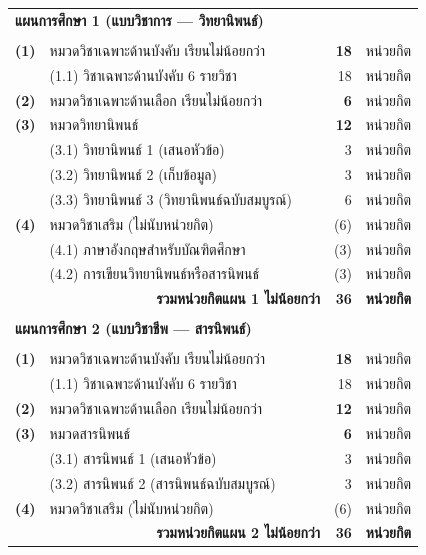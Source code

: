 \vspace{4pt}
\begingroup
\footnotesize
\setlength{\tabcolsep}{4pt}
\renewcommand{\arraystretch}{1.2}
\begin{tabularx}{\linewidth}{l>{\raggedright\arraybackslash}X r l r l}
  \multicolumn{6}{l}{\textbf{แผนการศึกษา 1 (แบบวิชาการ --- วิทยานิพนธ์)}} \\
  \multicolumn{6}{l}{} \\
  \textbf{(1)} & หมวดวิชาเฉพาะด้านบังคับ เรียนไม่น้อยกว่า & & & \textbf{18} & หน่วยกิต \\
  & \quad (1.1) วิชาเฉพาะด้านบังคับ 6 รายวิชา & & & 18 & หน่วยกิต \\
  \textbf{(2)} & หมวดวิชาเฉพาะด้านเลือก เรียนไม่น้อยกว่า & & & \textbf{6} & หน่วยกิต \\
  \textbf{(3)} & หมวดวิทยานิพนธ์ & & & \textbf{12} & หน่วยกิต \\
  & \quad (3.1) วิทยานิพนธ์ 1 (เสนอหัวข้อ) & & & 3 & หน่วยกิต \\
  & \quad (3.2) วิทยานิพนธ์ 2 (เก็บข้อมูล) & & & 3 & หน่วยกิต \\
  & \quad (3.3) วิทยานิพนธ์ 3 (วิทยานิพนธ์ฉบับสมบูรณ์) & & & 6 & หน่วยกิต \\
  \textbf{(4)} & หมวดวิชาเสริม (ไม่นับหน่วยกิต) & & & (6) & หน่วยกิต \\
  & \quad (4.1) ภาษาอังกฤษสำหรับบัณฑิตศึกษา & & & (3) & หน่วยกิต \\
  & \quad (4.2) การเขียนวิทยานิพนธ์หรือสารนิพนธ์ & & & (3) & หน่วยกิต \\
  \multicolumn{4}{r}{\textbf{รวมหน่วยกิตแผน 1 ไม่น้อยกว่า}} & \textbf{36} & \textbf{หน่วยกิต} \\
  \multicolumn{6}{l}{} \\
  \multicolumn{6}{l}{\textbf{แผนการศึกษา 2 (แบบวิชาชีพ --- สารนิพนธ์)}} \\
  \multicolumn{6}{l}{} \\
  \textbf{(1)} & หมวดวิชาเฉพาะด้านบังคับ เรียนไม่น้อยกว่า & & & \textbf{18} & หน่วยกิต \\
  & \quad (1.1) วิชาเฉพาะด้านบังคับ 6 รายวิชา & & & 18 & หน่วยกิต \\
  \textbf{(2)} & หมวดวิชาเฉพาะด้านเลือก เรียนไม่น้อยกว่า & & & \textbf{12} & หน่วยกิต \\
  \textbf{(3)} & หมวดสารนิพนธ์ & & & \textbf{6} & หน่วยกิต \\
  & \quad (3.1) สารนิพนธ์ 1 (เสนอหัวข้อ) & & & 3 & หน่วยกิต \\
  & \quad (3.2) สารนิพนธ์ 2 (สารนิพนธ์ฉบับสมบูรณ์) & & & 3 & หน่วยกิต \\
  \textbf{(4)} & หมวดวิชาเสริม (ไม่นับหน่วยกิต) & & & (6) & หน่วยกิต \\
  \multicolumn{4}{r}{\textbf{รวมหน่วยกิตแผน 2 ไม่น้อยกว่า}} & \textbf{36} & \textbf{หน่วยกิต} \\
\end{tabularx}
\endgroup

